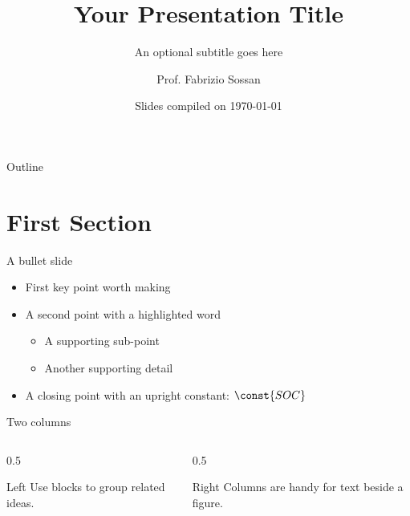 \documentclass[aspectratio=169,10pt]{beamer}
\title[Short Title]{Your Presentation Title}
\subtitle{An optional subtitle goes here}
\author[F. Sossan]{Prof. Fabrizio Sossan}
\institute{Gridlab, HES-SO Valais-Wallis\\fabrizio.sossan@hevs.ch}
\date{Slides compiled on \today}
\begin{document}
\begin{frame}
  \titlepage
\end{frame}

\begin{frame}{Outline}
  \tableofcontents
\end{frame}

\section{First Section}

\begin{frame}{A bullet slide}
  \begin{itemize}
    \item First key point worth making
    \item A second point with a \alert{highlighted} word
      \begin{itemize}
        \item A supporting sub-point
        \item Another supporting detail
      \end{itemize}
    \item A closing point with an upright constant: $\const{SOC}$
  \end{itemize}
\end{frame}

\begin{frame}{Two columns}
  \begin{columns}[T,onlytextwidth]
    \begin{column}{0.5\textwidth}
      \begin{block}{Left}
        Use blocks to group related ideas.
      \end{block}
    \end{column}
    \begin{column}{0.5\textwidth}
      \begin{block}{Right}
        Columns are handy for text beside a figure.
      \end{block}
    \end{column}
  \end{columns}
\end{frame}
\end{document}
